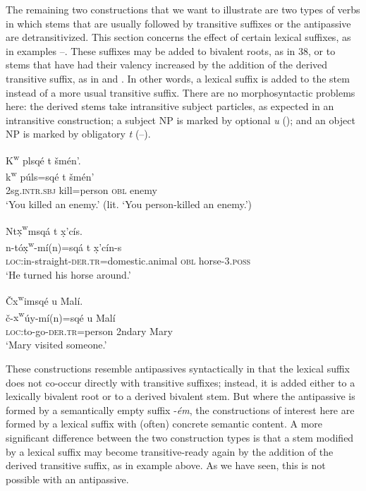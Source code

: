 \documentclass[output=paper,colorlinks,citecolor=brown]{langscibook}
\begin{document}
The remaining two constructions that we want to illustrate are two
types of verbs in which stems that are usually followed by transitive
suffixes or the antipassive are detransitivized.  This section
concerns the effect of certain lexical suffixes, as in examples --.
These suffixes may be added to bivalent roots, as in 38, or to stems
that have had their valency increased by the addition of the derived
transitive suffix, as in  and .  In other words, a lexical suffix
is added to the stem instead of a more usual transitive suffix.  There
are no morphosyntactic problems here: the derived stems take
intransitive subject particles, as expected in an intransitive
construction; a subject NP is marked by optional \emph{{\textltilde}u}
(); and an object NP is marked by obligatory \emph{t} (--).

\ea 
\label{ex-thomason-38}
{K\textsuperscript w} plsq\'e t \v{s}m\'en'. \\
\gll  k\textsuperscript w p\'uls=sq\'e t \v{s}m\'en' \\
2sg.\textsc{intr.sbj} kill=person \textsc{obl} enemy \\
\glt `You killed an enemy.' (lit. `You person-killed an enemy.')
\z

\ea 
\label{ex-thomason-39}
Nt{\d{x}\textsuperscript w}msq\'a t \d{x}{\textcrlambda}'c\'is. \\
\gll n-t\'o{\d{x}\textsuperscript w}-m\'i(n)=sq\'a t
 \d{x}{\textcrlambda}'c\'in-s \\
\textsc{loc}:in-straight-\textsc{der.tr}=domestic.animal \textsc{obl} horse-3.\textsc{poss} \\
\glt `He turned his horse around.'
\z

\ea  
\label{ex-thomason-40}
{\v{C}{x\textsuperscript w}imsq\'e {\textltilde}u Mal\'i.} \\
\gll \v{c}-{x\textsuperscript w}\'uy-m\'i(n)=sq\'e {\textltilde}u Mal\'i \\
\textsc{loc}:to-go-\textsc{der.tr}=person 2ndary Mary \\
\glt `Mary visited someone.'
\z

These constructions resemble antipassives syntactically in that the
lexical suffix does not co-occur directly with transitive suffixes;
instead, it is added either to a lexically bivalent root or to a
derived bivalent stem.  But where the antipassive is formed by a
semantically empty suffix -\emph{\'em}, the constructions of interest
here are formed by a lexical suffix with (often) concrete semantic
content.  A more significant difference between the two construction
types is that a stem modified by a lexical suffix may become
transitive-ready again by the addition of the derived transitive
suffix, as in example  above.  As we have seen, this is not possible
with an antipassive.
\end{document}
